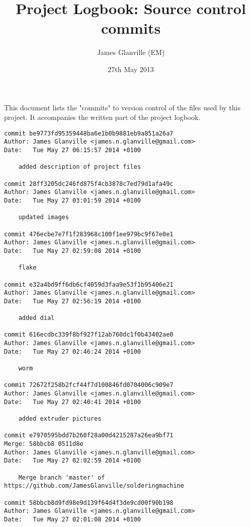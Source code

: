 \documentclass[a4paper,11pt]{article}  %
\title{Project Logbook: Source control commits} %
\author{James Glanville (EM)}
\date{27th May 2013}
\begin{document}
\maketitle

This document lists the "commits" to version control of the files used
by this project. It accompanies the written part of the project logbook.
\\

\begin{lstlisting}[frame=single]
commit be9773fd95359448ba6e1b0b9881eb9a851a26a7
Author: James Glanville <james.n.glanville@gmail.com>
Date:   Tue May 27 06:15:57 2014 +0100

    added description of project files

commit 28ff3205dc246fd875f4cb3878c7ed79d1afa49c
Author: James Glanville <james.n.glanville@gmail.com>
Date:   Tue May 27 03:01:59 2014 +0100

    updated images

commit 476ecbe7e7f1f283968c100f1ee979bc9f67e0e1
Author: James Glanville <james.n.glanville@gmail.com>
Date:   Tue May 27 02:59:08 2014 +0100

    flake

commit e32a4bd9ff6db6cf4059d3faa9e53f1b95406e21
Author: James Glanville <james.n.glanville@gmail.com>
Date:   Tue May 27 02:56:19 2014 +0100

    added dial

commit 616ecdbc339f8bf927f12ab760dc1f0b43402ae0
Author: James Glanville <james.n.glanville@gmail.com>
Date:   Tue May 27 02:46:24 2014 +0100

    worm

commit 72672f258b2fcf44f7d100846fd0704006c909e7
Author: James Glanville <james.n.glanville@gmail.com>
Date:   Tue May 27 02:40:41 2014 +0100

    added extruder pictures

commit e7970595bdd7b260f28a00d4215287a26ea9bf71
Merge: 58bbcb8 0511d8e
Author: James Glanville <james.n.glanville@gmail.com>
Date:   Tue May 27 02:02:59 2014 +0100

    Merge branch 'master' of https://github.com/JamesGlanville/solderingmachine

commit 58bbcb8d9fd98e9d139f64d4f3de9cd00f90b198
Author: James Glanville <james.n.glanville@gmail.com>
Date:   Tue May 27 02:01:08 2014 +0100


\end{lstlisting}
\end{document}
